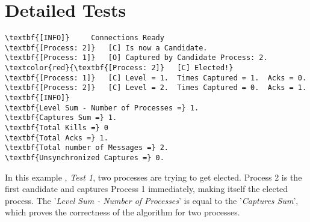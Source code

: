\section*{Detailed Tests}		

	\vspace{10pt}

	\begin{Verbatim}[commandchars=\\\{\},codes={\catcode`$=3\catcode`_=8},frame=single,label=Test 1 output]
\textbf{[INFO]}	  	Connections Ready
\textbf{[Process: 2]}	[C]	Is now a Candidate.
\textbf{[Process: 1]}	[O]	Captured by Candidate Process: 2.
\textcolor{red}{\textbf{[Process: 2]}	[C]	Elected!}
\textbf{[Process: 1]}	[C]	Level = 1.  Times Captured = 1.  Acks = 0.
\textbf{[Process: 2]}	[C]	Level = 2.  Times Captured = 0.  Acks = 1.
\textbf{[INFO]}
\textbf{Level Sum - Number of Processes =} 1.	
\textbf{Captures Sum =} 1.	
\textbf{Total Kills =} 0 	
\textbf{Total Acks =} 1.
\textbf{Total number of Messages =} 2.
\textbf{Unsynchronized Captures =} 0.
	\end{Verbatim}

	\vspace{10pt}

	In this example , \textit{Test 1}, two processes are trying to get elected. Process 2 is the first candidate and captures Process 1 immediately, making itself the elected process. The '\textit{Level Sum - Number of Processes}' is equal to the '\textit{Captures Sum}', which proves the correctness of the algorithm for two processes.

	\vspace{10pt}
	

